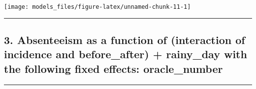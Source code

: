 \documentclass[]{article}
\begin{document}
\begin{center}\texttt{[image: models\_files/figure-latex/unnamed-chunk-11-1]} \end{center}

\newpage

\begin{center}\rule{0.5\linewidth}{\linethickness}\end{center}

\subsection{3. Absenteeism as a function of (interaction of incidence
and before\_after) + rainy\_day with the following fixed effects:
oracle\_number}\label{absenteeism-as-a-function-of-interaction-of-incidence-and-before_after-rainy_day-with-the-following-fixed-effects-oracle_number}

\begin{center}\rule{0.5\linewidth}{\linethickness}\end{center}
\end{document}
